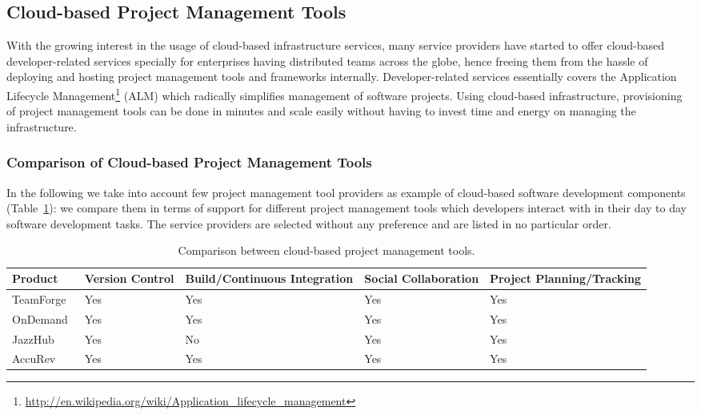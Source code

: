 \documentclass[11pt,fleqn,twoside]{article}
\begin{document}
\subsection{Cloud-based Project Management Tools}

With the growing interest in the usage of cloud-based infrastructure services, many service providers have started to offer cloud-based developer-related services specially for enterprises having distributed teams across the globe, hence freeing them from the hassle of deploying and hosting project management tools and frameworks internally. Developer-related services essentially covers the Application Lifecycle Management\footnote{\url{http://en.wikipedia.org/wiki/Application_lifecycle_management}} (ALM) which radically simplifies management of software projects. Using cloud-based infrastructure, provisioning of project management tools can be done in minutes and scale easily without having to invest time and energy on managing the infrastructure. 

\subsubsection{Comparison of Cloud-based Project Management Tools}
In the following we take into account few project management tool providers as example of cloud-based software development components (Table~\ref{prjtools}): we compare them in terms of support for different project management tools which developers interact with in their day to day software development tasks. The service providers are selected without any preference and are listed in no particular order.

\begin{table}[h]
\centering
\tiny {
\begin{tabular}{|p{2cm}|p{2cm}|p{2.5cm}|p{2.5cm}|p{2.5cm}|}
\hline
\tiny \textbf{Product} & \tiny \textbf{Version Control} & \tiny \textbf{Build/Continuous Integration} & \tiny \textbf{Social Collaboration} & \tiny \textbf{Project Planning/Tracking}\\
\hline
TeamForge & Yes & Yes & Yes & Yes \\
\hline
OnDemand~\cite{atlassian_url} & Yes & Yes & Yes & Yes \\
\hline
JazzHub~\cite{jazz_url} & Yes & No & Yes & Yes \\
\hline
AccuRev~\cite{accurev_url} & Yes & Yes & Yes & Yes \\
\hline
\end{tabular}
}
\caption{Comparison between cloud-based project management tools.}
\label{prjtools}
\end{table}
\end{document}
